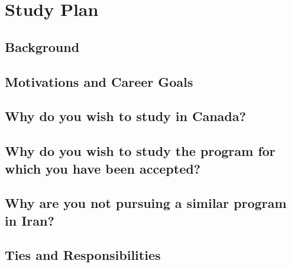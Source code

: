 
\chapter{Study Plan}\label{sec:study-plan}

\section*{Background}

\lipsum[1]

\section*{Motivations and Career Goals}

\lipsum[2]

\section*{Why do you wish to study in Canada?}

\lipsum[3-4]

\section*{Why do you wish to study the program for which you have been accepted?}

\lipsum[1-2]

\section*{Why are you not pursuing a similar program in Iran?}

\lipsum[1][1-15]

\section*{Ties and Responsibilities}

\lipsum[1]

\clearpage
